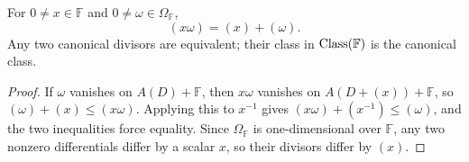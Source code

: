 \begin{theorem}
\label{par-thm-canonical-scaling}
\uses{}
For $0\neq x\in\mathbb F$ and $0\neq\omega\in\Omega_{\mathbb F}$,
\[
(x\omega)=(x)+(\omega).
\]
Any two canonical divisors are equivalent; their class in
$\operatorname{Class}(\mathbb F)$ is the canonical class.
\end{theorem}
\begin{proof}
If $\omega$ vanishes on $A(D)+\mathbb F$, then $x\omega$ vanishes on
$A(D+(x))+\mathbb F$, so $(\omega)+(x)\leq(x\omega)$. Applying this to
$x^{-1}$ gives $(x\omega)+(x^{-1})\leq(\omega)$, and the two inequalities
force equality. Since $\Omega_{\mathbb F}$ is one-dimensional over $\mathbb F$,
any two nonzero differentials differ by a scalar $x$, so their divisors differ
by $(x)$.
\end{proof}
